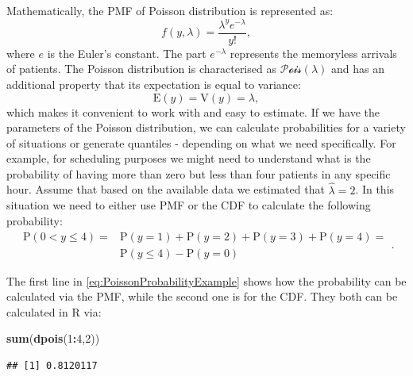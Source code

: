 \documentclass[
]{book}
\newenvironment{Shaded}{\begin{snugshade}}{\end{snugshade}}
\newcommand{\DecValTok}[1]{\textcolor[rgb]{0.00,0.00,0.81}{#1}}
\newcommand{\KeywordTok}[1]{\textcolor[rgb]{0.13,0.29,0.53}{\textbf{#1}}}
\newcommand{\NormalTok}[1]{#1}
\newcommand{\OperatorTok}[1]{\textcolor[rgb]{0.81,0.36,0.00}{\textbf{#1}}}
\theoremstyle{definition}
\theoremstyle{definition}
\theoremstyle{definition}
\theoremstyle{definition}
\theoremstyle{remark}
\begin{document}
Mathematically, the PMF of Poisson distribution is represented as:
\begin{equation}
    f(y, \lambda) = \frac{\lambda^y e^{-\lambda}}{y!} ,
    \label{eq:PoissonPMF}
\end{equation}
where \(e\) is the Euler's constant. The part \(e^{-\lambda}\) represents the memoryless arrivals of patients. The Poisson distribution is characterised as \(\mathcal{Pois}(\lambda)\) and has an additional property that its expectation is equal to variance:
\begin{equation}
    \mathrm{E}(y) = \mathrm{V}(y) = \lambda ,
    \label{eq:PoissonMean}
\end{equation}
which makes it convenient to work with and easy to estimate. If we have the parameters of the Poisson distribution, we can calculate probabilities for a variety of situations or generate quantiles - depending on what we need specifically. For example, for scheduling purposes we might need to understand what is the probability of having more than zero but less than four patients in any specific hour. Assume that based on the available data we estimated that \(\hat{\lambda}=2\). In this situation we need to either use PMF or the CDF to calculate the following probability:
\begin{equation}
    \begin{aligned}
        \mathrm{P}(0 < y \leq 4) = & \mathrm{P}(y=1) + \mathrm{P}(y=2) + \mathrm{P}(y=3) + \mathrm{P}(y=4) = \\
                                   & \mathrm{P}(y \leq 4) - \mathrm{P}(y=0)
    \end{aligned} .
    \label{eq:PoissonProbabilityExample}
\end{equation}

The first line in \eqref{eq:PoissonProbabilityExample} shows how the probability can be calculated via the PMF, while the second one is for the CDF. They both can be calculated in R via:

\begin{Shaded}
\begin{Highlighting}[]
\KeywordTok{sum}\NormalTok{(}\KeywordTok{dpois}\NormalTok{(}\DecValTok{1}\OperatorTok{:}\DecValTok{4}\NormalTok{,}\DecValTok{2}\NormalTok{))}
\end{Highlighting}
\end{Shaded}

\begin{verbatim}
## [1] 0.8120117
\end{verbatim}
\end{document}
